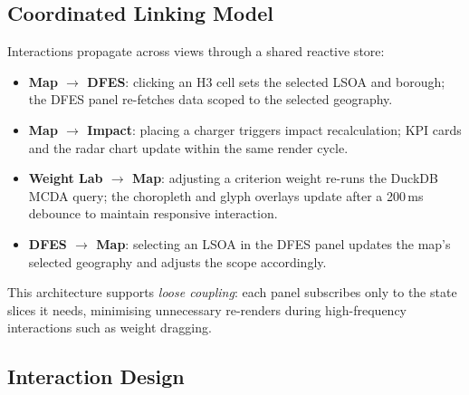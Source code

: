 \subsection{Coordinated Linking Model}
\label{sec:linking}

Interactions propagate across views through a shared reactive store:

\begin{itemize}[nosep]
    \item \textbf{Map $\rightarrow$ DFES}: clicking an H3 cell sets the selected LSOA and borough; the DFES panel re-fetches data scoped to the selected geography.
    \item \textbf{Map $\rightarrow$ Impact}: placing a charger triggers impact recalculation; KPI cards and the radar chart update within the same render cycle.
    \item \textbf{Weight Lab $\rightarrow$ Map}: adjusting a criterion weight re-runs the DuckDB MCDA query; the choropleth and glyph overlays update after a 200\,ms debounce to maintain responsive interaction.
    \item \textbf{DFES $\rightarrow$ Map}: selecting an LSOA in the DFES panel updates the map's selected geography and adjusts the scope accordingly.
\end{itemize}

\noindent This architecture supports \emph{loose coupling}: each panel subscribes only to the state slices it needs, minimising unnecessary re-renders during high-frequency interactions such as weight dragging.

\subsection{Interaction Design}
\label{sec:roth}


